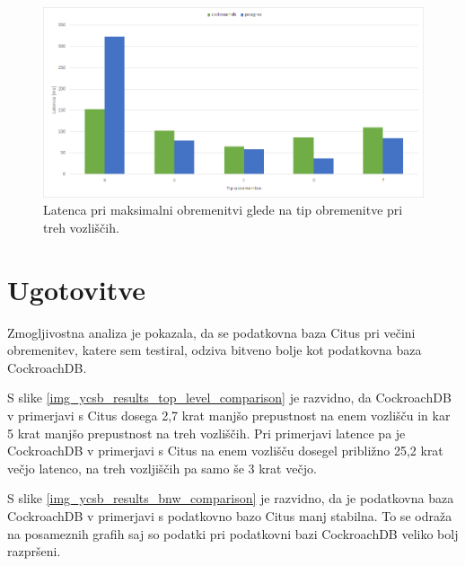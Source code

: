 \documentclass[a4paper, 12pt]{book}
\begin{document}
\begin{figure}[H]
\begin{center}
\includegraphics[width=1\textwidth]{resources/maxThroughput-latency-n3-v2.png}
\end{center}
\caption{Latenca pri maksimalni obremenitvi glede na tip obremenitve pri treh vozliščih.}
\label{img_ycsb_results_max_throughput_latency_n3}
\end{figure}

\section{Ugotovitve}
Zmogljivostna analiza je pokazala, da se podatkovna baza Citus pri večini obremenitev, katere sem testiral, odziva bitveno bolje kot podatkovna baza CockroachDB.

S slike \ref{img_ycsb_results_top_level_comparison} je razvidno, da CockroachDB v primerjavi s Citus dosega 2,7 krat manjšo prepustnost na enem vozlišču in kar 5 krat manjšo prepustnost na treh vozliščih. Pri primerjavi latence pa je CockroachDB v primerjavi s Citus na enem vozlišču dosegel približno 25,2 krat večjo latenco, na treh vozljiščih pa samo še 3 krat večjo.

S slike \ref{img_ycsb_results_bnw_comparison} je razvidno, da je podatkovna baza CockroachDB v primerjavi s podatkovno bazo Citus manj stabilna. To se odraža na posameznih grafih saj so podatki pri podatkovni bazi CockroachDB veliko bolj razpršeni.


\end{document}
